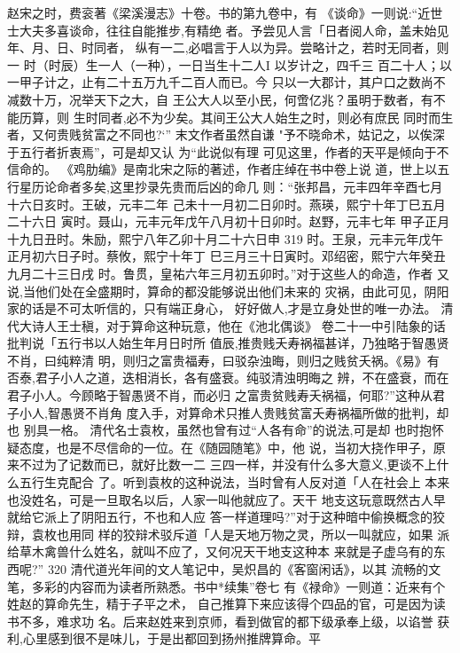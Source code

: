赵宋之时，费衮著《梁溪漫志》十卷。书的第九卷中，有
《谈命》一则说:“近世士大夫多喜谈命，往往自能推步,有精绝
者。予尝见人言「日者阅人命，盖未始见年、月、日、时同者，
纵有一二,必唱言于人以为异。尝略计之，若时无同者，则一
时（时辰）生一人（一种），一日当生十二人I 以岁计之，四千三
百二十人；以一甲子计之，止有二十五万九千二百人而已。今
只以一大郡计，其户口之数尚不减数十万，况举天下之大，自
王公大人以至小民，何啻亿兆？虽明于数者，有不能历算，则
生时同者,必不为少矣。其间王公大人始生之时，则必有庶民
同时而生者，又何贵贱贫富之不同也?‘” 末文作者虽然自谦
"予不晓命术，姑记之，以俟深于五行者折衷焉”，可是却又认
为“此说似有理 可见这里，作者的天平是倾向于不信命的。
《鸡肋编》是南北宋之际的著述，作者庄绰在书中卷上说
道，世上以五行星历论命者多矣,这里抄录先贵而后凶的命几
则：“张邦昌，元丰四年辛酉七月十六日亥时。王破，元丰二年
己未十一月初二日卯时。燕瑛，熙宁十年丁巳五月二十六日
寅时。聂山，元丰元年戊午八月初十日卯时。赵野，元丰七年
甲子正月十九日丑时。朱励，熙宁八年乙卯十月二十六日申
319 
时。王泉，元丰元年戊午正月初六日子时。蔡攸，熙宁十年丁
巳三月三十日寅时。邓绍密，熙宁六年癸丑九月二十三日戌
时。鲁贯，皇祐六年三月初五卯时。”对于这些人的命造，作者
又说,当他们处在全盛期时，算命的都没能够说出他们未来的
灾祸，由此可见，阴阳家的话是不可太听信的，只有端正身心，
好好做人,才是立身处世的唯一办法。
清代大诗人王士稹，对于算命这种玩意，他在《池北偶谈》
卷二十一中引陆象的话批判说「五行书以人始生年月日时所
值辰,推贵贱夭寿祸福甚详，乃独略于智愚贤不肖，曰纯粹清
明，则归之富贵福寿，曰驳杂浊晦，则归之贱贫夭祸。《易》有
否泰,君子小人之道，迭相消长，各有盛衰。纯驳清浊明晦之
辨，不在盛衰，而在君子小人。今顾略于智愚贤不肖，而必归
之富贵贫贱寿夭祸福，何耶?”这种从君子小人,智愚贤不肖角
度入手，对算命术只推人贵贱贫富夭寿祸福所做的批判，却也
别具一格。
清代名士袁枚，虽然也曾有过“人各有命”的说法,可是却
也时抱怀疑态度，也是不尽信命的一位。在《随园随笔》中，他
说，当初大挠作甲子，原来不过为了记数而已，就好比数一二
三四一样，并没有什么多大意义,更谈不上什么五行生克配合
了。听到袁枚的这种说法，当时曾有人反对道「人在社会上
本来也没姓名，可是一旦取名以后，人家一叫他就应了。天干
地支这玩意既然古人早就给它派上了阴阳五行，不也和人应
答一样道理吗?”对于这种暗中偷换概念的狡辩，袁枚也用同
样的狡辩术驳斥道「人是天地万物之灵，所以一叫就应，如果
派给草木禽兽什么姓名，就叫不应了，又何况天干地支这种本
来就是子虚乌有的东西呢?”
320 
清代道光年间的文人笔记中，吴炽昌的《客窗闲话》，以其
流畅的文笔，多彩的内容而为读者所熟悉。书中*续集”卷七
有《禄命》一则道：近来有个姓赵的算命先生，精于子平之术，
自己推算下来应该得个四品的官，可是因为读书不多，难求功
名。后来赵姓来到京师，看到做官的都下级承奉上级，以谄誉
获利,心里感到很不是味儿，于是出都回到扬州推牌算命。平
